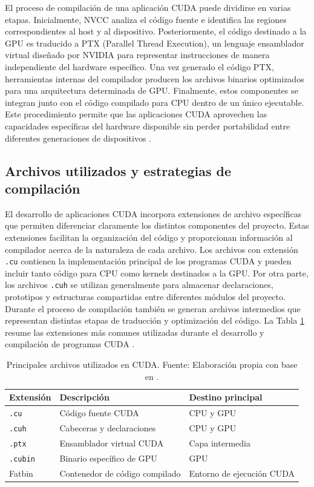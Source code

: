 El proceso de compilación de una aplicación CUDA puede dividirse en varias etapas. Inicialmente, NVCC analiza el código fuente e identifica las regiones correspondientes al host y al dispositivo. Posteriormente, el código destinado a la GPU es traducido a PTX (Parallel Thread Execution), un lenguaje ensamblador virtual diseñado por NVIDIA para representar instrucciones de manera independiente del hardware específico. Una vez generado el código PTX, herramientas internas del compilador producen los archivos binarios optimizados para una arquitectura determinada de GPU. Finalmente, estos componentes se integran junto con el código compilado para CPU dentro de un único ejecutable. Este procedimiento permite que las aplicaciones CUDA aprovechen las capacidades específicas del hardware disponible sin perder portabilidad entre diferentes generaciones de dispositivos \cite{nvccGuide,nvidiaProgrammingGuide}.

\subsection{Archivos utilizados y estrategias de compilación}

El desarrollo de aplicaciones CUDA incorpora extensiones de archivo específicas que permiten diferenciar claramente los distintos componentes del proyecto. Estas extensiones facilitan la organización del código y proporcionan información al compilador acerca de la naturaleza de cada archivo. Los archivos con extensión \texttt{.cu} contienen la implementación principal de los programas CUDA y pueden incluir tanto código para CPU como kernels destinados a la GPU. Por otra parte, los archivos \texttt{.cuh} se utilizan generalmente para almacenar declaraciones, prototipos y estructuras compartidas entre diferentes módulos del proyecto. Durante el proceso de compilación también se generan archivos intermedios que representan distintas etapas de traducción y optimización del código. La Tabla \ref{tab:archivos_cuda} resume las extensiones más comunes utilizadas durante el desarrollo y compilación de programas CUDA \cite{nvccGuide,investigacionCUDA}.

\begin{table}[H]
\centering
\caption{Principales archivos utilizados en CUDA. Fuente: Elaboración propia con base en \cite{nvccGuide,nvidiaProgrammingGuide}.}
\label{tab:archivos_cuda}
\begin{tabular}{|p{2.5cm}|p{5cm}|p{4cm}|}
\hline
\textbf{Extensión} & \textbf{Descripción} & \textbf{Destino principal} \\
\hline
\texttt{.cu} & Código fuente CUDA & CPU y GPU \\
\hline
\texttt{.cuh} & Cabeceras y declaraciones & CPU y GPU \\
\hline
\texttt{.ptx} & Ensamblador virtual CUDA & Capa intermedia \\
\hline
\texttt{.cubin} & Binario específico de GPU & GPU \\
\hline
Fatbin & Contenedor de código compilado & Entorno de ejecución CUDA \\
\hline
\end{tabular}
\end{table}

